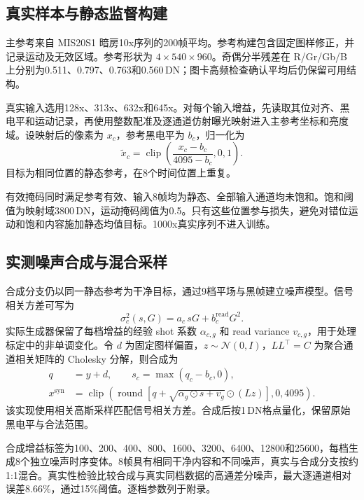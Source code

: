 \documentclass[11pt,a4paper,UTF8,fontset=fandol]{ctexart}
\newcommand{\dn}{\ensuremath{\,\mathrm{DN}}}
\begin{document}
\FloatBarrier
\subsection{真实样本与静态监督构建}

主参考来自 MIS20S1 暗房10x序列的200帧平均。参考构建包含固定图样修正，并记录运动及无效区域。参考形状为 $4\times540\times960$。奇偶分半残差在 R/Gr/Gb/B 上分别为0.511、0.797、0.763和0.560\dn；图卡高频检查确认平均后仍保留可用结构。

真实输入选用128x、313x、632x和645x。对每个输入增益，先读取其位对齐、黑电平和运动记录，再使用整数配准及逐通道仿射曝光映射进入主参考坐标和亮度域。设映射后的像素为 $x_c$，参考黑电平为 $b_c$，归一化为
\begin{equation}
 \widetilde{x}_c=\operatorname{clip}\left(\frac{x_c-b_c}{4095-b_c},0,1\right).
 \label{eq:normalization}
\end{equation}
目标为相同位置的静态参考，在8个时间位置上重复。

有效掩码同时满足参考有效、输入8帧均为静态、全部输入通道均未饱和。饱和阈值为映射域3800\dn，运动掩码阈值为0.5。只有这些位置参与损失，避免对错位运动和饱和内容施加静态均值目标。1000x真实序列不进入训练。

\subsection{实测噪声合成与混合采样}

合成分支仍以同一静态参考为干净目标，通过9档平场与黑帧建立噪声模型。信号相关方差可写为
\begin{equation}
 \sigma_c^2(s,G)=a_c\,sG+b_c^{\mathrm{read}}G^2.
\end{equation}
实际生成器保留了每档增益的经验 shot 系数 $\alpha_{c,g}$ 和 read variance $v_{c,g}$，用于处理标定中的非单调变化。令 $d$ 为固定图样偏置，$z\sim\mathcal N(0,I)$，$LL^\top=C$ 为聚合通道相关矩阵的 Cholesky 分解，则合成为
\begin{align}
 q &= y+d,\qquad s_c=\max(q_c-b_c,0),\\
 x^{\mathrm{syn}} &= \operatorname{clip}\left(
 \operatorname{round}\left[q+\sqrt{\alpha_g\odot s+v_g}\odot(Lz)\right],0,4095\right).
 \label{eq:synthetic}
\end{align}
该实现使用相关高斯采样匹配信号相关方差。合成后按1\dn{}格点量化，保留原始黑电平与合法范围。

合成增益标签为100、200、400、800、1600、3200、6400、12800和25600，每档生成8个独立噪声时序变体。8帧具有相同干净内容和不同噪声，真实与合成分支按约1:1混合。真实性检验比较合成与真实同档数据的高通差分噪声，最大逐通道相对误差8.66\%，通过15\%阈值。逐档参数列于附录。
\end{document}
